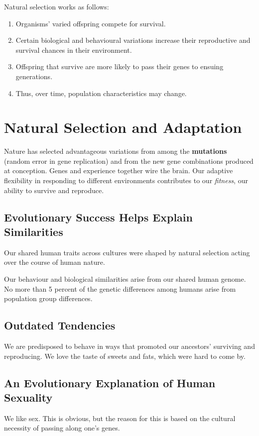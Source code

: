 \documentclass[12pt]{article}
\begin{document}
Natural selection works as follows:
\begin{enumerate}
\item Organisms' varied offspring compete for survival.
\item Certain biological and behavioural variations increase their reproductive and survival chances in their environment. 
\item Offspring that survive are more likely to pass their genes to ensuing generations.
\item Thus, over time, population characteristics may change.
\end{enumerate}

\section*{Natural Selection and Adaptation}
Nature has selected advantageous variations from among the \textbf{mutations} (random error in gene replication) and from the new gene combinations produced at conception. Genes and experience together wire the brain. Our adaptive flexibility in responding to different environments contributes to our \textit{fitness}, our ability to survive and reproduce.

\subsection*{Evolutionary Success Helps Explain Similarities}
Our shared human traits across cultures were shaped by natural selection acting over the course of human nature.

Our behaviour and biological similarities arise from our shared human genome. No more than 5 percent of the genetic differences among humans arise from population group differences. 

\subsection*{Outdated Tendencies}
We are predisposed to behave in ways that promoted our ancestors' surviving and reproducing. We love the taste of sweets and fats, which were hard to come by. 

\subsection*{An Evolutionary Explanation of Human Sexuality}
We like sex. This is obvious, but the reason for this is based on the cultural necessity of passing along one's genes.
\end{document}
